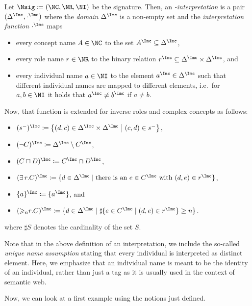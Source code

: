 \begin{definition}
  \label{def:n-interpretation}
  Let $\Nsig\coloneqq(\NC,\NR,\NI)$ be the signature. Then, an \emph{\Nsig-interpretation \I} is a pair
  $(\Delta^{\I}, \cdot^{\I})$ where the \emph{domain} $\Delta^{\I}$ is a non-empty set and
  the \emph{interpretation function} $\cdot^{\I}$ maps
  \begin{itemize}
  \item every concept name $A\in\NC$ to the set $A^{\I}\subseteq\Delta^{\I}$,
  \item every role name $r\in\NR$ to the binary relation
    $r^{\I}\subseteq\Delta^{\I}\times\Delta^{\I}$, and
  \item every individual name $a\in\NI$ to the element $a^{\I}\in\Delta^{\I}$ such that different
    individual names are mapped to different elements, i.e.\ for $a,b\in\NI$ it holds that
    $a^{\I}\neq b^{\I}$ if $a\neq b$.
  \end{itemize}

  Now, that function is extended for inverse roles and complex concepts as follows:
  \begin{itemize}
  \item $(s^{-})^{\I} \coloneqq \left\{(d,c)\in\Delta^{\I}\times\Delta^{\I}\mmid (c,d)\in
      s^{-}\right\}$,
  \item $(\lnot C)^{\I} \coloneqq \Delta^{\I} \setminus C^{\I}$,
  \item $(C \sqcap D)^{\I} \coloneqq C^{\I} \cap D^{\I}$,
  \item $(\exists r.C)^{\I} \coloneqq \{d \in \Delta^\I \mid \text{there is an}\ e \in C^\I \
    \text{with}\ (d,e)\in r^\I\}$,
  \item $\{a\}^{\I} \coloneqq \{a^{\I}\}$, and
  \item $(\atleast{n}{r}{C})^{\I} \coloneqq \{d \in \Delta^{\I} \mid \sharp\{e\in C^{\I}\mid (d,e)\in r^{\I}\}\ge n\}$.
  \end{itemize}
  where $\sharp S$ denotes the cardinality of the set $S$.
\end{definition}

Note that in the above definition of an interpretation, we include the so-called \emph{unique name
  assumption} stating that every individual is interpreted as distinct element. Here, we emphasize
that an individual name is meant to be the identity of an individual, rather than just a tag as it is usually
used in the context of semantic web.

Now, we can look at a first example using the notions just defined.

